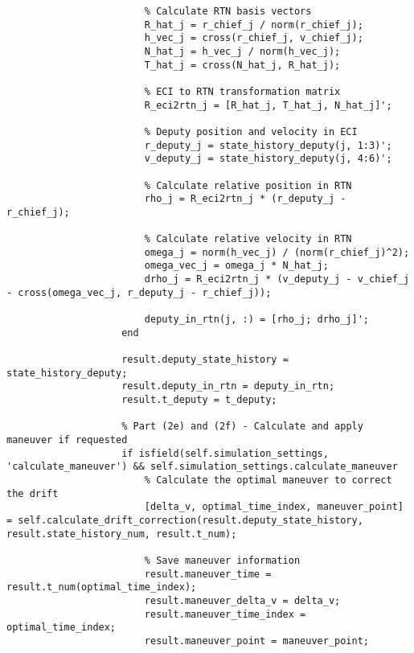 \begin{lstlisting}
                        % Calculate RTN basis vectors
                        R_hat_j = r_chief_j / norm(r_chief_j);
                        h_vec_j = cross(r_chief_j, v_chief_j);
                        N_hat_j = h_vec_j / norm(h_vec_j);
                        T_hat_j = cross(N_hat_j, R_hat_j);
                        
                        % ECI to RTN transformation matrix
                        R_eci2rtn_j = [R_hat_j, T_hat_j, N_hat_j]';
                        
                        % Deputy position and velocity in ECI
                        r_deputy_j = state_history_deputy(j, 1:3)';
                        v_deputy_j = state_history_deputy(j, 4:6)';
                        
                        % Calculate relative position in RTN
                        rho_j = R_eci2rtn_j * (r_deputy_j - r_chief_j);
                        
                        % Calculate relative velocity in RTN
                        omega_j = norm(h_vec_j) / (norm(r_chief_j)^2);
                        omega_vec_j = omega_j * N_hat_j;
                        drho_j = R_eci2rtn_j * (v_deputy_j - v_chief_j - cross(omega_vec_j, r_deputy_j - r_chief_j));
                        
                        deputy_in_rtn(j, :) = [rho_j; drho_j]';
                    end
                    
                    result.deputy_state_history = state_history_deputy;
                    result.deputy_in_rtn = deputy_in_rtn;
                    result.t_deputy = t_deputy;
                    
                    % Part (2e) and (2f) - Calculate and apply maneuver if requested
                    if isfield(self.simulation_settings, 'calculate_maneuver') && self.simulation_settings.calculate_maneuver
                        % Calculate the optimal maneuver to correct the drift
                        [delta_v, optimal_time_index, maneuver_point] = self.calculate_drift_correction(result.deputy_state_history, result.state_history_num, result.t_num);
                        
                        % Save maneuver information
                        result.maneuver_time = result.t_num(optimal_time_index);
                        result.maneuver_delta_v = delta_v;
                        result.maneuver_time_index = optimal_time_index;
                        result.maneuver_point = maneuver_point;
                        

\end{lstlisting}

